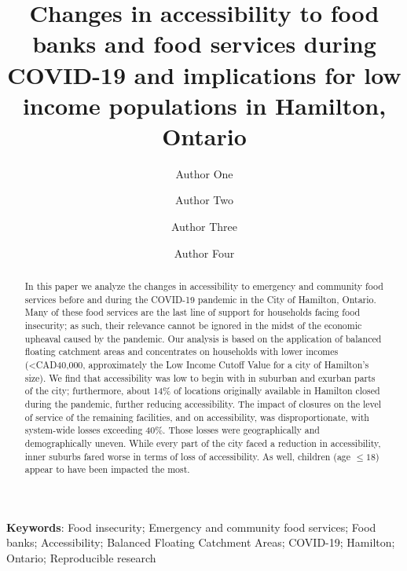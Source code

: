 \documentclass[]{elsarticle} %
\begin{document}
\begin{frontmatter}

  \title{Changes in accessibility to food banks and food services during
COVID-19 and implications for low income populations in Hamilton,
Ontario}
    \author[Some University]{Author One}
    \author[Another University]{Author Two}
    \author[Some University]{Author Three}
    \author[Some University]{Author Four}
      \address[Some University]{Department, Street, City, State, Zip}
    \address[Another University]{Department, Street, City, State, Zip}
  
  \begin{abstract}
  In this paper we analyze the changes in accessibility to emergency and
  community food services before and during the COVID-19 pandemic in the
  City of Hamilton, Ontario. Many of these food services are the last
  line of support for households facing food insecurity; as such, their
  relevance cannot be ignored in the midst of the economic upheaval
  caused by the pandemic. Our analysis is based on the application of
  balanced floating catchment areas and concentrates on households with
  lower incomes (\textless CAD40,000, approximately the Low Income
  Cutoff Value for a city of Hamilton's size). We find that
  accessibility was low to begin with in suburban and exurban parts of
  the city; furthermore, about 14\% of locations originally available in
  Hamilton closed during the pandemic, further reducing accessibility.
  The impact of closures on the level of service of the remaining
  facilities, and on accessibility, was disproportionate, with
  system-wide losses exceeding 40\%. Those losses were geographically
  and demographically uneven. While every part of the city faced a
  reduction in accessibility, inner suburbs fared worse in terms of loss
  of accessibility. As well, children (age \(\le 18\)) appear to have
  been impacted the most.
  \end{abstract}
  
 \end{frontmatter}

\textbf{Keywords}: Food insecurity; Emergency and community food
services; Food banks; Accessibility; Balanced Floating Catchment Areas;
COVID-19; Hamilton; Ontario; Reproducible research
\end{document}
